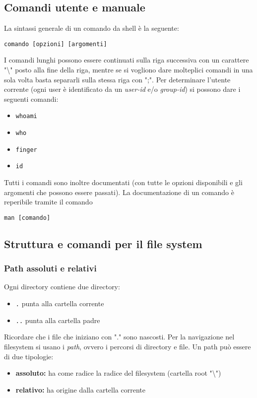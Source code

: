 \documentclass[a4paper]{article}
\begin{document}
\subsection{Comandi utente e manuale}
La sintassi generale di un comando da shell è la seguente:
\begin{verbatim}
comando [opzioni] [argomenti]
\end{verbatim}
I comandi lunghi possono essere continuati sulla riga successiva con un carattere "\textbackslash" posto alla fine della riga, mentre se si vogliono dare molteplici comandi in una sola volta basta separarli sulla stessa riga con ";".
Per determinare l'utente corrente (ogni user è identificato da un \textit{user-id} e/o \textit{group-id}) si possono dare i seguenti comandi:
\begin{itemize}
\item \verb|whoami|
\item \verb|who|
\item \verb|finger|
\item \verb|id|
\end{itemize}
Tutti i comandi sono inoltre documentati (con tutte le opzioni disponibili e gli argomenti che possono essere passati). La documentazione di un comando è reperibile tramite il comando
\begin{verbatim}
man [comando]
\end{verbatim}
\subsection{Struttura e comandi per il file system}
\subsubsection{Path assoluti e relativi}
Ogni directory contiene due directory:
\begin{itemize}
\item \verb|.| punta alla cartella corrente
\item \verb|..| punta alla cartella padre
\end{itemize}
Ricordare che i file che iniziano con "." sono nascosti.
Per la navigazione nel filesystem si usano i \textit{path}, ovvero i percorsi di directory e file. Un path può essere di due tipologie:
\begin{itemize}
\item \textbf{assoluto:} ha come radice la radice del filesystem (cartella root "\textbackslash")
\item \textbf{relativo:} ha origine dalla cartella corrente
\end{itemize}
\end{document}
